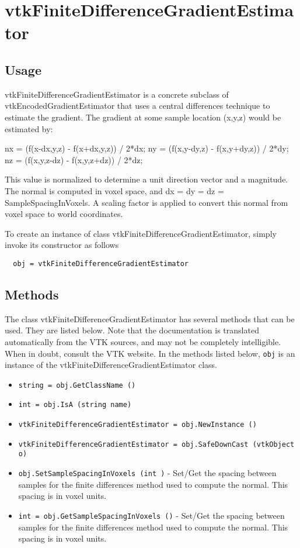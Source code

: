\section{vtkFiniteDifferenceGradientEstimator}

\subsection{Usage}

  vtkFiniteDifferenceGradientEstimator is a concrete subclass of 
  vtkEncodedGradientEstimator that uses a central differences technique to
  estimate the gradient. The gradient at some sample location (x,y,z)
  would be estimated by:
      
       nx = (f(x-dx,y,z) - f(x+dx,y,z)) / 2*dx;
       ny = (f(x,y-dy,z) - f(x,y+dy,z)) / 2*dy;
       nz = (f(x,y,z-dz) - f(x,y,z+dz)) / 2*dz;

  This value is normalized to determine a unit direction vector and a
  magnitude. The normal is computed in voxel space, and 
  dx = dy = dz = SampleSpacingInVoxels. A scaling factor is applied to
  convert this normal from voxel space to world coordinates.


To create an instance of class vtkFiniteDifferenceGradientEstimator, simply
invoke its constructor as follows
\begin{verbatim}
  obj = vtkFiniteDifferenceGradientEstimator
\end{verbatim}
\subsection{Methods}

The class vtkFiniteDifferenceGradientEstimator has several methods that can be used.
  They are listed below.
Note that the documentation is translated automatically from the VTK sources,
and may not be completely intelligible.  When in doubt, consult the VTK website.
In the methods listed below, \verb|obj| is an instance of the vtkFiniteDifferenceGradientEstimator class.
\begin{itemize}
\item  \verb|string = obj.GetClassName ()|

\item  \verb|int = obj.IsA (string name)|

\item  \verb|vtkFiniteDifferenceGradientEstimator = obj.NewInstance ()|

\item  \verb|vtkFiniteDifferenceGradientEstimator = obj.SafeDownCast (vtkObject o)|

\item  \verb|obj.SetSampleSpacingInVoxels (int )| -  Set/Get the spacing between samples for the finite differences
 method used to compute the normal. This spacing is in voxel units.

\item  \verb|int = obj.GetSampleSpacingInVoxels ()| -  Set/Get the spacing between samples for the finite differences
 method used to compute the normal. This spacing is in voxel units.

\end{itemize}
